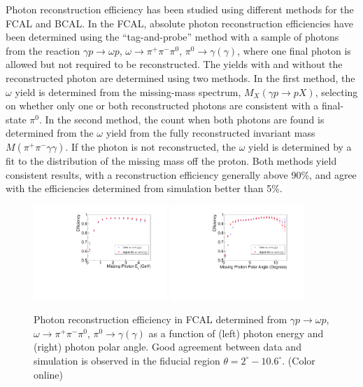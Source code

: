 
Photon reconstruction efficiency has been studied using different methods for the FCAL and BCAL.  In the FCAL, absolute photon reconstruction efficiencies have been determined using the ``tag-and-probe'' method with a sample of photons from the reaction $\gamma p \to \omega p$, $\omega \to \pi^+\pi^-\pi^0$, $\pi^0 \to \gamma (\gamma)$, where one final photon is allowed but not required to be reconstructed.  The yields with and without the reconstructed photon are determined using two methods.  In the first method, the $\omega$ yield is determined from the missing-mass spectrum, $M_X(\gamma p \rightarrow pX)$, selecting on whether only one or both reconstructed photons are consistent with a final-state $\pi^0$. In the second method,  the count when both photons are found is determined from the $\omega$ yield from the fully reconstructed invariant mass $M(\pi^+\pi^-\gamma\gamma)$. If the photon is not reconstructed, the $\omega$ yield is determined by a fit to the distribution of the missing mass off the proton.  Both methods yield consistent results, with a reconstruction efficiency generally above 90\%, and agree with the efficiencies determined from simulation better than 5\%.

\begin{figure}[tbp]
\begin{center}
\includegraphics[width=0.45\textwidth]{figures/OmegaCompareE.pdf}
\includegraphics[width=0.45\textwidth]{figures/OmegaCompareTheta.pdf}
\caption{\label{fig:fcalphotoneff}
Photon reconstruction efficiency in FCAL determined from $\gamma p \to \omega p$, $\omega \to \pi^+\pi^-\pi^0$, $\pi^0 \to \gamma (\gamma)$ as a function of (left) photon energy and (right) photon polar angle.  Good agreement between data and simulation is observed in the fiducial region $\theta = 2^\circ - 10.6^\circ$.
 (Color online)}
\end{center}
\end{figure}

